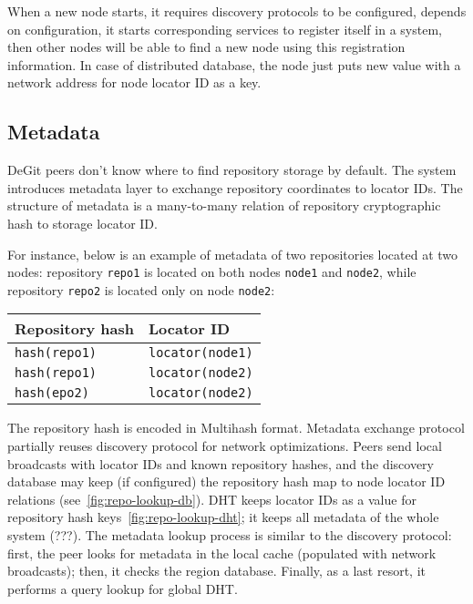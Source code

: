 \documentclass[acmlarge, screen, nonacm, 11pt]{acmart}
\newcommand{\code}[1]{\texttt{#1}}
\begin{document}
When a new node starts, it requires discovery protocols to be configured,
depends on configuration, it starts corresponding services to register itself in a system,
then other nodes will be able to find a new node using this registration information. In case
of distributed database, the node just puts new value with a network address for node locator ID
as a key.

\subsection{Metadata}\label{sec:metadata}

DeGit peers don't know where to find repository storage by default.
The system introduces metadata layer to exchange repository coordinates
to locator IDs. The structure of metadata is a many-to-many relation of
repository cryptographic hash to storage locator ID.

For instance, below is an example of metadata of two repositories located at two nodes:
repository \code{repo1} is located on both nodes \code{node1} and \code{node2}, while
repository \code{repo2} is located only on node \code{node2}:

\begin{tabular}{l | l}
  Repository hash & Locator ID \\ \hline
  \code{hash(repo1)} & \code{locator(node1)} \\
  \code{hash(repo1)} & \code{locator(node2)} \\
  \code{hash(epo2)} & \code{locator(node2)} \\
\end{tabular}

The repository hash is encoded in Multihash format. Metadata exchange protocol partially reuses
discovery protocol for network optimizations. Peers send local broadcasts
with locator IDs and known repository hashes, and the discovery database may keep (if configured)
the repository hash map to node locator ID relations (see~\ref{fig:repo-lookup-db}).
DHT keeps locator IDs as a value for repository hash keys~\ref{fig:repo-lookup-dht};
it keeps all metadata of the whole system (???). The metadata lookup process is similar to the discovery protocol:
first, the peer looks for metadata in the local cache (populated with network broadcasts); then, it checks
the region database. Finally, as a last resort, it performs a query lookup for global DHT.
\end{document}
